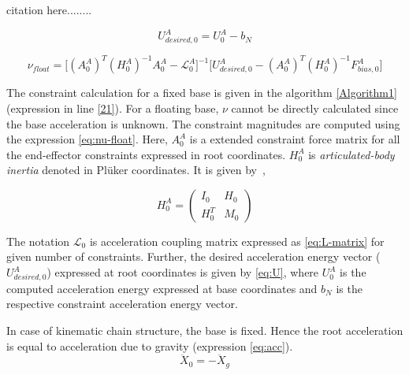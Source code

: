 
{\color{red} citation here........}

\begin{equation}\label{eq:U}
	U_{desired, 0}^A = U_0^A - b_N 
\end{equation}

\begin{equation}\label{eq:nu-float}
	\nu_{float} = \big[ (A_0^A)^T (H_0^A)^{-1} A_0^A - \mathcal{L}_0^A \big]^{-1} \big[ U_{desired, 0}^A - (A_0^A)^T (H_0^A)^{-1} F_{bias, 0}^A \big]
\end{equation}


The constraint calculation for a fixed base is given in the algorithm \ref{Algorithm1} (expression in line \ref{21}). For a floating base, $\nu$ cannot be directly calculated since the base acceleration is unknown. The constraint magnitudes are computed using the expression \ref{eq:nu-float}. Here, $A_0^A$ is a extended constraint force matrix for all the end-effector constraints expressed in root coordinates. $H_0^A$ is \textit{articulated-body inertia} denoted in Pl{\"u}ker coordinates. It is given by~\cite{featherstone2014rigid},

\begin{equation}
	\label{eq:RBI}
	H_0^A = \begin{pmatrix}
		I_0 & H_0 \\
		H_0^T & M_0
	\end{pmatrix}
\end{equation}

The notation $\mathcal{L}_0$ is acceleration coupling matrix expressed as \ref{eq:L-matrix} for given number of constraints. Further, the desired acceleration energy vector ($U_{desired, 0}^A$) expressed at root coordinates is given by \ref{eq:U}, where $U_0^A$ is the computed acceleration energy expressed at base coordinates and $b_N$ is the respective constraint acceleration energy vector. 


In case of kinematic chain structure, the base is fixed. Hence the root acceleration is equal to acceleration due to gravity (expression \ref{eq:acc}). 
\begin{equation}
	\label{eq:acc}
	\ddot{X}_0 = -\ddot{X}_g
\end{equation}

